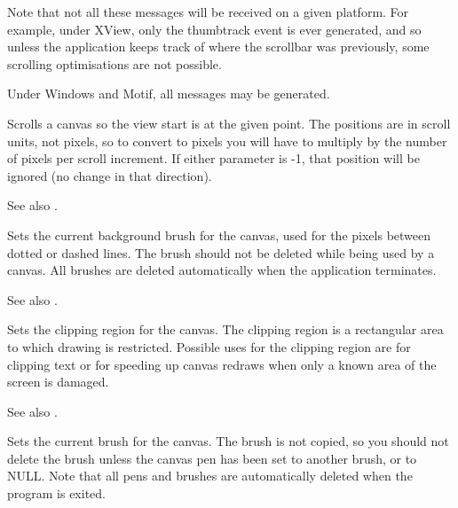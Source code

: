 Note that not all these messages will be received on a given
platform. For example, under XView, only the thumbtrack event
is ever generated, and so unless the application keeps track of
where the scrollbar was previously, some scrolling optimisations are not
possible.

Under Windows and Motif, all messages may be generated.



Scrolls a canvas so the view start is at the given point. The
positions are in scroll units, not pixels, so to convert to pixels you
will have to multiply by the number of pixels per scroll increment.
If either parameter is -1, that position will be ignored (no change in
that direction).

See also .



Sets the current background brush for the canvas, used for the pixels
between dotted or dashed lines.  The brush should not be deleted while
being used by a canvas. All brushes are deleted automatically when the
application terminates.

See also .



Sets the clipping region for the canvas. The clipping region is a
rectangular area to which drawing is restricted.  Possible uses for
the clipping region are for clipping text or for speeding up canvas
redraws when only a known area of the screen is damaged.

See also .



Sets the current brush for the canvas.  The brush is not copied, so
you should not delete the brush unless the canvas pen has been set to
another brush, or to NULL. Note that all pens and brushes are
automatically deleted when the program is exited.

